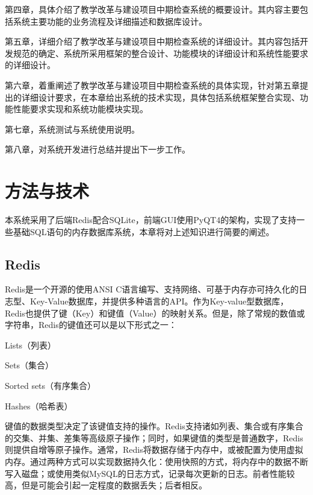 \documentclass{zjutthesis}
\begin{document}
第四章，具体介绍了教学改革与建设项目中期检查系统的概要设计。其内容主要包括系统主要功能的业务流程及详细描述和数据库设计。

第五章，详细介绍了教学改革与建设项目中期检查系统的详细设计。其内容包括开发规范的确定、系统所采用框架的整合设计、功能模块的详细设计和系统性能要求的详细设计。

第六章，着重阐述了教学改革与建设项目中期检查系统的具体实现，针对第五章提出的详细设计要求，在本章给出系统的技术实现，具体包括系统框架整合实现、功能性能要求实现和系统功能模块实现。

第七章，系统测试与系统使用说明。

第八章，对系统开发进行总结并提出下一步工作。



\chapter{方法与技术}
本系统采用了后端Redis配合SQLite，前端GUI使用PyQT4的架构，实现了支持一些基础SQL语句的内存数据库系统，本章将对上述知识进行简要的阐述。

\section{Redis}
Redis是一个开源的使用ANSI C语言编写、支持网络、可基于内存亦可持久化的日志型、Key-Value数据库，并提供多种语言的API。作为Key-value型数据库，Redis也提供了键（Key）和键值（Value）的映射关系。但是，除了常规的数值或字符串，Redis的键值还可以是以下形式之一：

Lists（列表）

Sets（集合）

Sorted sets（有序集合）

Hashes（哈希表）

键值的数据类型决定了该键值支持的操作。Redis支持诸如列表、集合或有序集合的交集、并集、差集等高级原子操作；同时，如果键值的类型是普通数字，Redis则提供自增等原子操作。通常，Redis将数据存储于内存中，或被配置为使用虚拟内存。通过两种方式可以实现数据持久化：使用快照的方式，将内存中的数据不断写入磁盘；或使用类似MySQL的日志方式，记录每次更新的日志。前者性能较高，但是可能会引起一定程度的数据丢失；后者相反。
\end{document}
